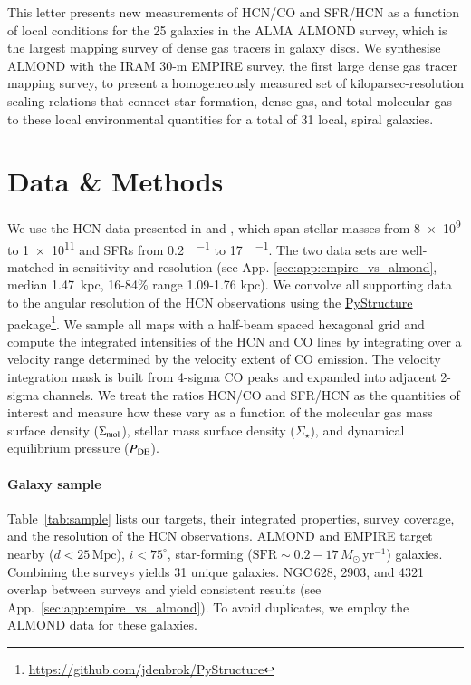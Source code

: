 \documentclass[letter, longauth]{aa} %
\begin{document}
This letter presents new measurements of HCN/CO and SFR/HCN as a function of local conditions for the 25 galaxies in the ALMA ALMOND survey, which is the largest mapping survey of dense gas tracers in galaxy discs. 
We synthesise ALMOND with the IRAM 30-m EMPIRE survey, the first large dense gas tracer mapping survey, to present a homogeneously measured set of kiloparsec-resolution scaling relations that connect star formation, dense gas, and total molecular gas to these local environmental quantities for a total of 31 local, spiral galaxies. 

\section{Data \& Methods}
\label{sec:data}
We use the HCN data presented in \citet[][EMPIRE]{Jimenez-Donaire2019} and \citet[][ALMOND]{Neumann2023a}, which span stellar masses from \SI{8e9}{\msun} to \SI{1e11}{\msun} and SFRs from \SI{0.2}{\msun\per\year} to \SI{17}{\msun\per\year}.
The two data sets are well-matched in sensitivity and resolution (see App. \ref{sec:app:empire_vs_almond}, median 1.47~kpc, 16{-}84\% range 1.09{-}1.76 kpc). 
We convolve all supporting data to the angular resolution of the HCN observations using the \hyperlink{https://zenodo.org/records/13787728}{PyStructure} package\footnote{\url{https://github.com/jdenbrok/PyStructure}}. 
We sample all maps with a half-beam spaced hexagonal grid and compute the integrated intensities of the HCN and CO lines by integrating over a velocity range determined by the velocity extent of CO emission. 
The velocity integration mask is built from 4-sigma CO peaks and expanded into adjacent 2-sigma channels.
We treat the ratios HCN/CO and SFR/HCN as the quantities of interest and measure how these vary as a function of the molecular gas mass surface density ($\Sigma_{\rm mol}$), stellar mass surface density ($\Sigma_\star$), and dynamical equilibrium pressure ($P_{\rm DE}$).


\paragraph{Galaxy sample} 

Table~\ref{tab:sample} lists our targets, their integrated properties, survey coverage, and the resolution of the HCN observations. 
ALMOND and EMPIRE target nearby ($d<25\,\mathrm{Mpc}$), $i<75^\circ$, star-forming ($\mathrm{SFR}\sim0.2-17\,M_\odot\,\mathrm{yr}^{-1}$) galaxies. 
Combining the surveys yields 31 unique galaxies.
NGC\,628, 2903, and 4321 overlap between surveys and yield consistent results (see App.~\ref{sec:app:empire_vs_almond}). 
To avoid duplicates, we employ the ALMOND data for these galaxies.
\end{document}
